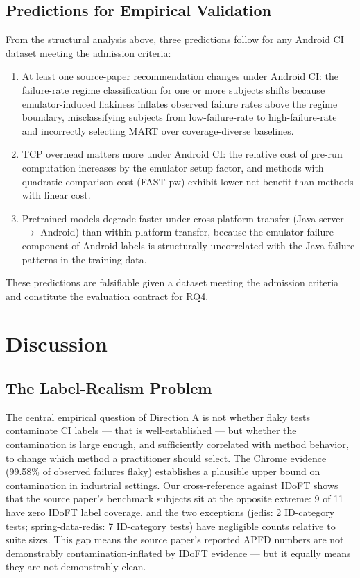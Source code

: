 \documentclass[conference]{IEEEtran}
\begin{document}
\subsection{Predictions for Empirical Validation}

From the structural analysis above, three predictions follow for any Android CI dataset meeting the admission criteria:
\begin{enumerate}[leftmargin=*]
\item At least one source-paper recommendation changes under Android CI: the failure-rate regime classification for one or more subjects shifts because emulator-induced flakiness inflates observed failure rates above the regime boundary, misclassifying subjects from low-failure-rate to high-failure-rate and incorrectly selecting MART over coverage-diverse baselines.
\item TCP overhead matters more under Android CI: the relative cost of pre-run computation increases by the emulator setup factor, and methods with quadratic comparison cost (FAST-pw) exhibit lower net benefit than methods with linear cost.
\item Pretrained models degrade faster under cross-platform transfer (Java server $\to$ Android) than within-platform transfer, because the emulator-failure component of Android labels is structurally uncorrelated with the Java failure patterns in the training data.
\end{enumerate}
These predictions are falsifiable given a dataset meeting the admission criteria and constitute the evaluation contract for RQ4.



\section{Discussion}

\subsection{The Label-Realism Problem}

The central empirical question of Direction A is not whether flaky tests contaminate CI labels — that is well-established — but whether the contamination is large enough, and sufficiently correlated with method behavior, to change which method a practitioner should select. The Chrome evidence (99.58\% of observed failures flaky) establishes a plausible upper bound on contamination in industrial settings. Our cross-reference against IDoFT shows that the source paper's benchmark subjects sit at the opposite extreme: 9 of 11 have zero IDoFT label coverage, and the two exceptions (jedis: 2 ID-category tests; spring-data-redis: 7 ID-category tests) have negligible counts relative to suite sizes. This gap means the source paper's reported APFD numbers are not demonstrably contamination-inflated by IDoFT evidence — but it equally means they are not demonstrably clean.
\end{document}
